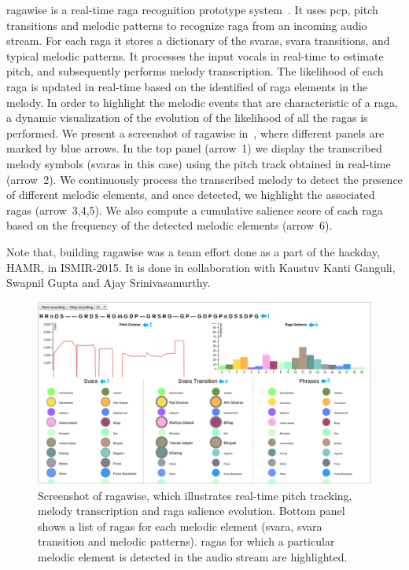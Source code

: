 \gls{ragawise} is a real-time \gls{raga} recognition prototype system~\citep{ragawise}. It uses \gls{pcp}, pitch transitions and melodic patterns to recognize \gls{raga} from an incoming audio stream. For each \gls{raga} it stores a dictionary of the \glspl{svara}, \gls{svara} transitions, and typical melodic patterns. It processes the input vocals in real-time to estimate pitch, and subsequently performs melody transcription. The likelihood of each \gls{raga} is updated in real-time based on the identified of \gls{raga} elements in the melody. In order to highlight the melodic events that are characteristic of a \gls{raga}, a dynamic visualization of the evolution of the likelihood of all the \glspl{raga} is performed. We present a screenshot of \gls{ragawise} in~, where different panels are marked by blue arrows. In the top panel (arrow~1) we display the transcribed melody symbols (\glspl{svara} in this case) using the pitch track obtained in real-time (arrow~2). We continuously process the transcribed melody to detect the presence of different melodic elements, and once detected, we highlight the associated \glspl{raga} (arrow~3,4,5). We also compute a cumulative salience score of each \gls{raga} based on the frequency of the detected melodic elements (arrow~6).

Note that, building \gls{ragawise} was a team effort done as a part of the hackday, HAMR, in ISMIR-2015. It is done in collaboration with Kaustuv Kanti Ganguli, Swapnil Gupta and Ajay Srinivasamurthy. 

\begin{figure}
	\begin{center}
		\includegraphics[width=\figSizeHundred]{ch08_applications/figures/ragawise.pdf}
	\end{center}
	\caption[Screenshot of \gls{ragawise}]{Screenshot of \gls{ragawise}, which illustrates real-time pitch tracking, melody transcription and \gls{raga} salience evolution. Bottom panel shows a list of \glspl{raga} for each melodic element (\gls{svara}, \gls{svara} transition and melodic patterns). \Glspl{raga} for which a particular melodic element is detected in the audio stream are highlighted.}
	\label{fig:ragawise}
\end{figure}


